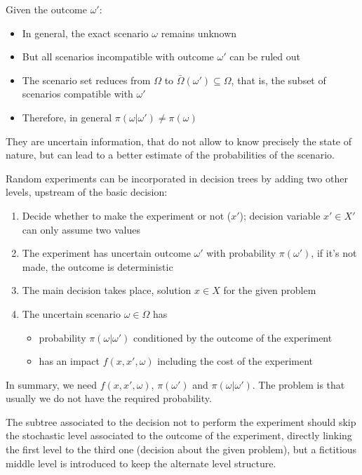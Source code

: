Given the outcome $\omega'$:
\begin{itemize}
	\item In general, the exact scenario $\omega$ remains unknown
	
	\item But all scenarios incompatible with outcome $\omega'$ can be ruled out 
	
	\item The scenario set reduces from $\Omega$ to $\bar \Omega (\omega') \subseteq \Omega$, that is, the subset of scenarios compatible with $\omega'$
	
	\item Therefore, in general $\pi (\omega | \omega') \neq \pi(\omega)$
\end{itemize}
They are uncertain information, that do not allow to know precisely the state of nature, but can lead to a better estimate of the probabilities of the scenario.

Random experiments can be incorporated in decision trees by adding two other levels, upstream of the basic decision:
\begin{enumerate}
	\item Decide whether to make the experiment or not ($x'$); decision variable $x' \in X'$ can only assume two values
	
	\item The experiment has uncertain outcome $\omega'$ with probability $\pi (\omega')$, if it's not made, the outcome is deterministic
	
	\item The main decision takes place, solution $x \in X$ for the given problem
	
	\item The uncertain scenario $\omega \in \Omega$ has 
	\begin{itemize}
		\item probability $\pi (\omega | \omega')$ conditioned by the outcome of the experiment
		
		\item has an impact $f(x, x', \omega)$ including the cost of the experiment
	\end{itemize}
\end{enumerate}

In summary, we need $f(x, x', \omega)$, $\pi(\omega')$ and $\pi(\omega| \omega')$. The problem is that usually we do not have the required probability. 

The subtree associated to the decision not to perform the experiment should skip the stochastic level associated to the outcome of the experiment, directly linking the first level to the third one (decision about the given problem), but a fictitious middle level is introduced to keep the alternate level structure.


